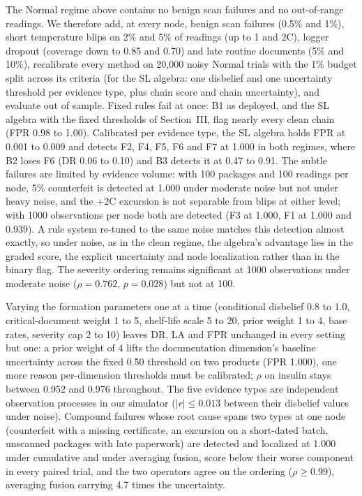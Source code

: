 \documentclass[conference]{IEEEtran}
\begin{document}
The Normal regime above contains no benign scan failures and no
out-of-range readings. We therefore add, at every node, benign scan
failures (0.5\% and 1\%), short temperature blips on 2\% and 5\% of
readings (up to 1 and 2\textdegree C), logger dropout (coverage down to
0.85 and 0.70) and late routine documents (5\% and 10\%), recalibrate
every method on 20{,}000 noisy Normal trials with the 1\% budget split
across its criteria (for the SL algebra: one disbelief and one
uncertainty threshold per evidence type, plus chain score and chain
uncertainty), and evaluate out of sample. Fixed rules fail at once: B1
as deployed, and the SL algebra with the fixed thresholds of
Section~III, flag nearly every clean chain (FPR 0.98 to 1.00).
Calibrated per evidence type, the SL algebra holds FPR at 0.001 to 0.009
and detects F2, F4, F5, F6 and F7 at 1.000 in both regimes, where B2
loses F6 (DR 0.06 to 0.10) and B3 detects it at 0.47 to 0.91. The subtle
failures are limited by evidence volume: with 100 packages and 100
readings per node, 5\% counterfeit is detected at 1.000 under moderate
noise but not under heavy noise, and the +2\textdegree C excursion is
not separable from blips at either level; with 1000 observations per
node both are detected (F3 at 1.000, F1 at 1.000 and 0.939). A rule
system re-tuned to the same noise matches this detection almost exactly,
so under noise, as in the clean regime, the algebra's advantage lies in
the graded score, the explicit uncertainty and node localization rather
than in the binary flag. The severity ordering remains significant at
1000 observations under moderate noise ($\rho = 0.762$, $p = 0.028$) but
not at 100.

Varying the formation parameters one at a time (conditional disbelief
0.8 to 1.0, critical-document weight 1 to 5, shelf-life scale 5 to 20,
prior weight 1 to 4, base rates, severity cap 2 to 10) leaves DR, LA and
FPR unchanged in every setting but one: a prior weight of 4 lifts the
documentation dimension's baseline uncertainty across the fixed 0.50
threshold on two products (FPR 1.000), one more reason per-dimension
thresholds must be calibrated; $\rho$ on insulin stays between 0.952
and 0.976 throughout. The five evidence types are independent
observation processes in our simulator ($|r| \le 0.013$ between their
disbelief values under noise). Compound failures whose root cause spans
two types at one node (counterfeit with a missing certificate, an
excursion on a short-dated batch, unscanned packages with late
paperwork) are detected and localized at 1.000 under cumulative and
under averaging fusion, score below their worse component in every
paired trial, and the two operators agree on the ordering
($\rho \ge 0.99$), averaging fusion carrying 4.7 times the uncertainty.
\end{document}
